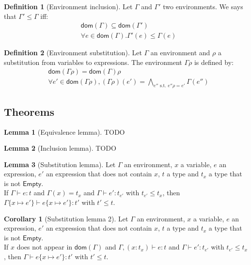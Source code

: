 \documentclass[a4paper]{article}%
\newcommand{\dom}[1]{\textsf{dom}(#1)}
\newcommand{\Empty} {\textsf{Empty}}%
\newcommand{\subst}[3]{#1\{#2 \mapsto #3\}}
\theoremstyle{definition}
\newtheorem{lemma}{Lemma}
\newtheorem{definition}{Definition}
\newtheorem{corollary}{Corollary}
\begin{document}
  \begin{definition}[Environment inclusion]
    Let $\Gamma$ and $\Gamma'$ two environments. We says that $\Gamma' \leq \Gamma$ iff:
    \begin{align*} 
      &\dom \Gamma \subseteq \dom {\Gamma'}\\
      &\forall e \in \dom \Gamma. \Gamma'(e) \leq \Gamma(e)
    \end{align*}
  \end{definition}

  \begin{definition}[Environment substitution]
    Let $\Gamma$ an environment and $\rho$ a substitution from variables to expressions.
    The environment $\Gamma\rho$ is defined by:
    \begin{align*}
      &\dom {\Gamma\rho} = \dom \Gamma \rho\\
      &\forall e' \in \dom {\Gamma\rho}, (\Gamma\rho)(e') = \bigwedge_{e'' \text{ s.t. } e''\rho=e'}\Gamma(e'')
    \end{align*}
  \end{definition}

    \subsection{Theorems}

    \begin{lemma}[Equivalence lemma]
      TODO
    \end{lemma}

    \begin{lemma}[Inclusion lemma]
      TODO
    \end{lemma}

    \begin{lemma}[Substitution lemma]
      Let $\Gamma$ an environment, $x$ a variable, $e$ an expression, $e'$ an expression that does not contain $x$, $t$ a type and $t_x$ a type that is not $\Empty$.\\
      If $\Gamma \vdash e:t$ and $\Gamma(x) = t_x$ and $\Gamma \vdash e':t_{e'}$ with $t_{e'} \leq t_x$, then $\subst \Gamma x {e'} \vdash \subst e x {e'}:t'$ with $t'\leq t$.
    \end{lemma}

    \begin{corollary}[Substitution lemma 2]
      Let $\Gamma$ an environment, $x$ a variable, $e$ an expression, $e'$ an expression that does not contain $x$, $t$ a type and $t_x$ a type that is not $\Empty$.\\
      If $x$ does not appear in $\dom \Gamma$ and $\Gamma, (x:t_x) \vdash e:t$ and $\Gamma \vdash e':t_{e'}$ with $t_{e'} \leq t_x$, then $\Gamma \vdash \subst e x {e'}:t'$ with $t'\leq t$.
    \end{corollary}
\end{document}
